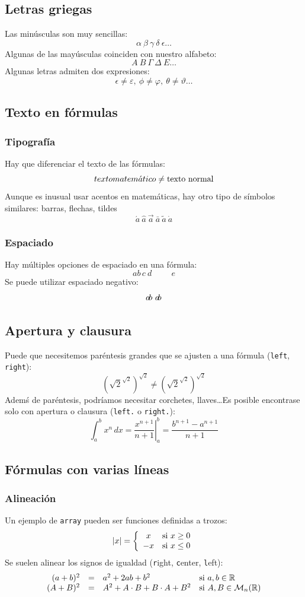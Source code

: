 \documentclass[12pt]{article}
\begin{document}
	\subsection{Letras griegas}
	Las minúsculas son muy sencillas:
	\[
	\alpha \ \beta \ \gamma \ \delta \ \epsilon \ldots 
	\]
	Algunas de las mayúsculas coinciden con nuestro alfabeto:
	\[
	A \ B \ \Gamma \ \Delta \ E \ldots 
	\]
	Algunas letras admiten dos expresiones:
	\[
	\epsilon \neq \varepsilon , \ \phi \neq \varphi, \ \theta \neq \vartheta \ldots 
	\]
	\subsection{Texto en fórmulas}
	\subsubsection{Tipografía}
	Hay que diferenciar el texto de las fórmulas:
	\[
	texto matem\acute{a}tico \neq \textnormal{texto normal}
	\]
	Aunque es inusual usar acentos en matemáticas, hay otro tipo de símbolos similares: barras, flechas, tildes
	\[
	\acute{a} \ \hat{a} \ \vec{a} \ \bar{a} \ \tilde{a} \ \dot{a}
	\]
	\subsubsection{Espaciado}
	Hay múltiples opciones de espaciado en una fórmula:
	\[
	a b \, c \ d \hspace{1cm} e
	\]
	Se puede utilizar espaciado negativo:
	\[
	a\!b \ a\hspace{-2pt}b 
	\]
	\subsection{Apertura y clausura}
	Puede que necesitemos paréntesis grandes que se ajusten a una fórmula (\texttt{left}, \texttt{right}):
	\[
	(\sqrt{2}^{\sqrt{2}})^{\sqrt{2}} \neq \left(\sqrt{2}^{\sqrt{2}}\right)^{\sqrt{2}}
	\]
	Ademś de paréntesis, podríamos necesitar corchetes, llaves\ldots Es posible encontrase solo con apertura o clausura (\texttt{left.} o \texttt{right.}):
	\[
	\int_a^b x^n\,dx=\left.\frac{x^{n+1}}{n+1}\right|_a^b=\frac{b^{n+1}-a^{n+1}}{n+1}
	\]
	\subsection{Fórmulas con varias líneas}
	\subsubsection{Alineación}
	Un ejemplo de \texttt{array} pueden ser funciones definidas a trozos:
	\[
	|x|=
	\left\{
	\begin{array}{cl} 
	x  & \textnormal{si }x \geq 0 \\
	-x & \textnormal{si }x \leq 0
	\end{array}
	\right.
	\]
	Se suelen alinear los signos de igualdad (\texttt{r}ight, \texttt{c}enter, \texttt{l}eft):
	\[
	\begin{array}{rcll}
	(a+b)^2&=&a^2+2ab+b^2 & \textnormal{si }a,b\in\mathbb{R} \\ 
	(A+B)^2&=&A^2+A \cdot B+B \cdot A+B^2 & \textnormal{si }A,B\in\mathcal{M}_n(\mathbb{R})
	\end{array}
	\]
\end{document}
